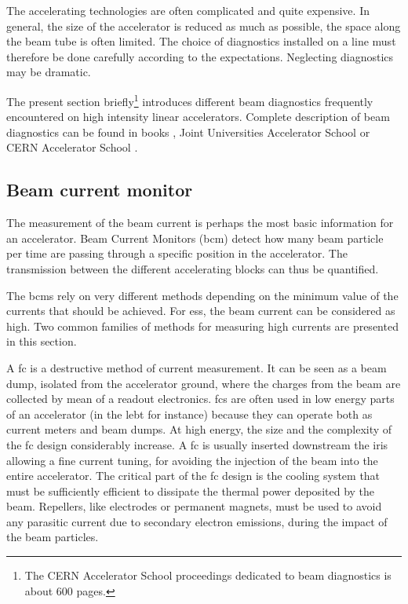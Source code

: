 \begin{refsection}
  The accelerating technologies are often complicated and quite expensive. In general, the size of the accelerator is reduced as much as possible, the space along the beam tube is often limited. The choice of diagnostics installed on a line must therefore be done carefully according to the expectations. Neglecting diagnostics may be dramatic.

  The present section briefly\footnote{The CERN Accelerator School proceedings  dedicated to beam diagnostics is about 600 pages.} introduces different beam diagnostics frequently encountered on high intensity linear accelerators. Complete description of beam diagnostics can be found in books \cite{strehl2006}, Joint Universities Accelerator School \cite{juas2019} or CERN Accelerator School \cite{cas2019}.

  \subsection{Beam current monitor}
  The measurement of the beam current is perhaps the most basic information for an accelerator. Beam Current Monitors (\acrshort{bcm}) detect how many beam particle per time are passing through a specific position in the accelerator. The transmission between the different accelerating blocks can thus be quantified.

  The \acrshort{bcm}s rely on very different methods depending on the minimum value of the currents that should be achieved. For \acrshort{ess}, the beam current can be considered as high. Two common families of methods for measuring high currents are presented in this section.

  A \acrfull{fc} is a destructive method of current measurement. It can be seen as a beam dump, isolated from the accelerator ground, where the charges from the beam are collected by mean of a readout electronics. \acrshort{fc}s are often used in low energy parts of an accelerator (in the \acrshort{lebt} for instance) because they can operate both as current meters and beam dumps. At high energy, the size and the complexity of the \acrshort{fc} design considerably increase. A \acrshort{fc} is usually inserted downstream the iris allowing a fine current tuning, for avoiding the injection of the beam into the entire accelerator. The critical part of the \acrshort{fc} design is the cooling system that must be sufficiently efficient to dissipate the thermal power deposited by the beam. Repellers, like electrodes or permanent magnets, must be used to avoid any parasitic current due to secondary electron emissions, during the impact of the beam particles.


\end{refsection}
